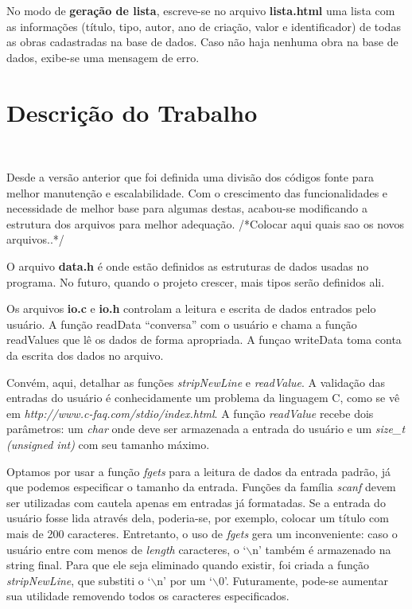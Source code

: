 \documentclass{article}
\begin{document}
No modo de \textbf{geração de lista}, escreve-se no arquivo \textbf{lista.html} uma lista com as informações (título, tipo, autor, ano de criação, valor e identificador) de todas as obras cadastradas na base de dados. Caso não haja nenhuma obra na base de dados, exibe-se uma mensagem de erro.

\section{Descrição do Trabalho}\

Desde a versão anterior que foi definida uma divisão dos códigos fonte para melhor manutenção e escalabilidade. Com o crescimento das funcionalidades e necessidade de melhor base para algumas destas, acabou-se modificando a estrutura dos arquivos para melhor adequação. /*Colocar aqui quais sao os novos arquivos..*/

O arquivo \textbf{data.h} é onde estão definidos as estruturas de dados usadas no programa. No futuro, quando o projeto crescer, mais tipos serão definidos ali.

Os arquivos \textbf{io.c} e \textbf{io.h} controlam a leitura e escrita de dados entrados pelo usuário. A função readData ``conversa'' com o usuário e chama a função readValues que lê os dados de forma apropriada. A funçao writeData toma conta da escrita dos dados no arquivo.

Convém, aqui, detalhar as funções \textit{stripNewLine} e \textit{readValue}. A validação das entradas do usuário é conhecidamente um problema da linguagem C, como se vê em \textit{http://www.c-faq.com/stdio/index.html}. A função \textit{readValue} recebe dois parâmetros: um \textit{char} onde deve ser armazenada a entrada do usuário e um \textit{size\_t (unsigned int)} com seu tamanho máximo.

Optamos por usar a função \textit{fgets} para a leitura de dados da entrada padrão, já que podemos especificar o tamanho da entrada. Funções da família \textit{scanf} devem ser utilizadas com cautela apenas em entradas já formatadas. Se a entrada do usuário fosse lida através dela, poderia-se, por exemplo, colocar um título com mais de 200 caracteres. Entretanto, o uso de \textit{fgets} gera um inconveniente: caso o usuário entre com menos de \textit{length} caracteres, o `$\backslash$n' também é armazenado na string final. Para que ele seja eliminado quando existir, foi criada a função \textit{stripNewLine}, que substiti o `$\backslash$n' por um `$\backslash$0'. Futuramente, pode-se aumentar sua utilidade removendo todos os caracteres especificados.
\end{document}
